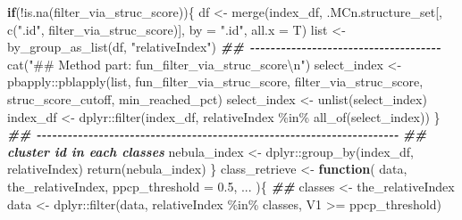 \documentclass[
]{article}
\newenvironment{Shaded}{\begin{snugshade}}{\end{snugshade}}
\newcommand{\AttributeTok}[1]{\textcolor[rgb]{0.77,0.63,0.00}{#1}}
\newcommand{\ControlFlowTok}[1]{\textcolor[rgb]{0.13,0.29,0.53}{\textbf{#1}}}
\newcommand{\DocumentationTok}[1]{\textcolor[rgb]{0.56,0.35,0.01}{\textbf{\textit{#1}}}}
\newcommand{\FloatTok}[1]{\textcolor[rgb]{0.00,0.00,0.81}{#1}}
\newcommand{\FunctionTok}[1]{\textcolor[rgb]{0.00,0.00,0.00}{#1}}
\newcommand{\NormalTok}[1]{#1}
\newcommand{\OtherTok}[1]{\textcolor[rgb]{0.56,0.35,0.01}{#1}}
\newcommand{\SpecialCharTok}[1]{\textcolor[rgb]{0.00,0.00,0.00}{#1}}
\newcommand{\StringTok}[1]{\textcolor[rgb]{0.31,0.60,0.02}{#1}}
\begin{document}
\begin{Shaded}
\begin{Highlighting}[]
    \ControlFlowTok{if}\NormalTok{(}\SpecialCharTok{!}\FunctionTok{is.na}\NormalTok{(filter\_via\_struc\_score))\{}
\NormalTok{      df }\OtherTok{\textless{}{-}} \FunctionTok{merge}\NormalTok{(index\_df, .MCn.structure\_set[, }\FunctionTok{c}\NormalTok{(}\StringTok{".id"}\NormalTok{, filter\_via\_struc\_score)],}
                  \AttributeTok{by =} \StringTok{".id"}\NormalTok{, }\AttributeTok{all.x =}\NormalTok{ T)}
\NormalTok{      list }\OtherTok{\textless{}{-}} \FunctionTok{by\_group\_as\_list}\NormalTok{(df, }\StringTok{"relativeIndex"}\NormalTok{)}
      \DocumentationTok{\#\# {-}{-}{-}{-}{-}{-}{-}{-}{-}{-}{-}{-}{-}{-}{-}{-}{-}{-}{-}{-}{-}{-}{-}{-}{-}{-}{-}{-}{-}{-}{-}{-}{-}{-}{-}{-}{-} }
      \FunctionTok{cat}\NormalTok{(}\StringTok{"\#\# Method part: fun\_filter\_via\_struc\_score}\SpecialCharTok{\textbackslash{}n}\StringTok{"}\NormalTok{)}
\NormalTok{      select\_index }\OtherTok{\textless{}{-}}\NormalTok{ pbapply}\SpecialCharTok{::}\FunctionTok{pblapply}\NormalTok{(list, fun\_filter\_via\_struc\_score,}
\NormalTok{                                        filter\_via\_struc\_score,}
\NormalTok{                                        struc\_score\_cutoff,}
\NormalTok{                                        min\_reached\_pct)}
\NormalTok{      select\_index }\OtherTok{\textless{}{-}} \FunctionTok{unlist}\NormalTok{(select\_index)}
\NormalTok{      index\_df }\OtherTok{\textless{}{-}}\NormalTok{ dplyr}\SpecialCharTok{::}\FunctionTok{filter}\NormalTok{(index\_df, relativeIndex }\SpecialCharTok{\%in\%} \FunctionTok{all\_of}\NormalTok{(select\_index))}
\NormalTok{    \}}
    \DocumentationTok{\#\# {-}{-}{-}{-}{-}{-}{-}{-}{-}{-}{-}{-}{-}{-}{-}{-}{-}{-}{-}{-}{-}{-}{-}{-}{-}{-}{-}{-}{-}{-}{-}{-}{-}{-}{-}{-}{-}{-}{-}{-}{-}{-}{-}{-}{-}{-}{-}{-}{-}{-}{-}{-}{-}{-}{-}{-}{-}{-}{-}{-}{-}{-}{-}{-}{-}{-}{-}{-}{-}{-} }
    \DocumentationTok{\#\# cluster id in each classes}
\NormalTok{    nebula\_index }\OtherTok{\textless{}{-}}\NormalTok{ dplyr}\SpecialCharTok{::}\FunctionTok{group\_by}\NormalTok{(index\_df, relativeIndex)}
    \FunctionTok{return}\NormalTok{(nebula\_index)}
\NormalTok{  \}}
\NormalTok{class\_retrieve }\OtherTok{\textless{}{-}}
  \ControlFlowTok{function}\NormalTok{(}
\NormalTok{           data,}
\NormalTok{           the\_relativeIndex,}
           \AttributeTok{ppcp\_threshold =} \FloatTok{0.5}\NormalTok{,}
\NormalTok{           ...}
\NormalTok{           )\{}
    \DocumentationTok{\#\#}
\NormalTok{    classes }\OtherTok{\textless{}{-}}\NormalTok{ the\_relativeIndex}
\NormalTok{    data }\OtherTok{\textless{}{-}}\NormalTok{ dplyr}\SpecialCharTok{::}\FunctionTok{filter}\NormalTok{(data, relativeIndex }\SpecialCharTok{\%in\%}\NormalTok{ classes, V1 }\SpecialCharTok{\textgreater{}=}\NormalTok{ ppcp\_threshold)}

\end{Highlighting}
\end{Shaded}
\end{document}
